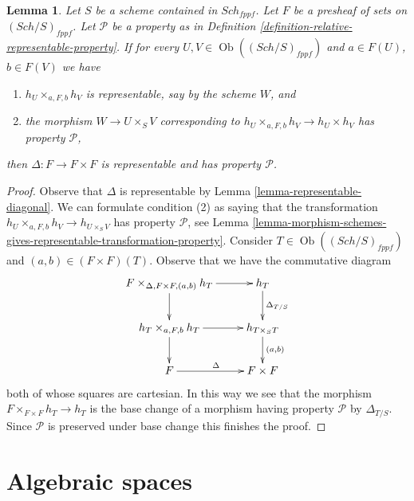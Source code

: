 \documentclass{stacks-project}
\theoremstyle{plain}
\newtheorem{lemma}[subsection]{Lemma}
\theoremstyle{definition}
\theoremstyle{remark}
\numberwithin{equation}{subsection}
\def\Sch{\mathit{Sch}}
\def\Ob{\mathop{\mathrm{Ob}}\nolimits}
\begin{document}
\begin{lemma}
\label{lemma-transformation-diagonal-properties}
Let $S$ be a scheme contained in $\Sch_{fppf}$.
Let $F$ be a presheaf of sets on $(\Sch/S)_{fppf}$.
Let $\mathcal{P}$ be a property as in
Definition \ref{definition-relative-representable-property}.
If for every $U, V \in \Ob((\Sch/S)_{fppf})$ and $a \in F(U)$,
$b \in F(V)$ we have
\begin{enumerate}
\item $h_U \times_{a, F, b} h_V$ is representable, say by the scheme $W$, and
\item the morphism $W \to U \times_S V$ corresponding to
$h_U \times_{a, F, b} h_V \to h_U \times h_V$ has property $\mathcal{P}$,
\end{enumerate}
then $\Delta : F \to F \times F$ is representable and has
property $\mathcal{P}$.
\end{lemma}

\begin{proof}
Observe that $\Delta$ is representable by
Lemma \ref{lemma-representable-diagonal}.
We can formulate condition (2) as saying that
the transformation $h_U \times_{a, F, b} h_V \to h_{U \times_S V}$
has property $\mathcal{P}$, see Lemma
\ref{lemma-morphism-schemes-gives-representable-transformation-property}.
Consider $T \in \Ob((\Sch/S)_{fppf})$ and $(a, b) \in (F \times F)(T)$.
Observe that we have the commutative diagram
$$
\xymatrix{
F \times_{\Delta, F \times F, (a, b)} h_T \ar[d] \ar[r] &
h_T \ar[d]^{\Delta_{T/S}} \\
h_T \times_{a, F, b} h_T \ar[r] \ar[d] &
h_{T \times_S T} \ar[d]^{(a, b)} \\
F \ar[r]^\Delta & F \times F
}
$$
both of whose squares are cartesian. In this way we see that
the morphism $F \times_{F \times F} h_T \to h_T$ is the base
change of a morphism having property $\mathcal{P}$ by
$\Delta_{T/S}$. Since $\mathcal{P}$ is preserved under base
change this finishes the proof.
\end{proof}


















\section{Algebraic spaces}
\label{section-algebraic-spaces}
\end{document}
